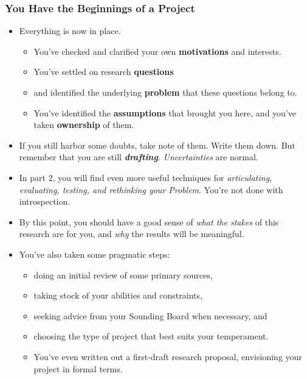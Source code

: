 \documentclass[11pt]{article}
\begin{document}
\subsubsection{You Have the Beginnings of a Project}
\begin{itemize}
\item Everything is now in place.
\begin{itemize}
\item You’ve checked and clarified your own \textbf{motivations} and interests.
\item You’ve settled on research \textbf{questions} 
\item and identified the underlying \textbf{problem} that these questions belong to.
\item You’ve identified the \textbf{assumptions} that brought you here, and you’ve taken \textbf{ownership} of them.
\end{itemize}

\item If you still harbor some doubts, take note of them. Write them down. But remember that you are still \emph{\textbf{drafting}}. \emph{Uncertainties} are normal.

\item In part 2, you will find even more useful techniques for \emph{articulating, evaluating, testing, and rethinking your Problem}. You’re not done with introspection.

\item By this point, you should have a good sense of \emph{what the stakes} of this research are for you, and \emph{why} the results will be meaningful. 

\item You’ve also taken some pragmatic steps:
\begin{itemize}
\item doing an initial review of some primary sources, 
\item taking stock of your abilities and constraints, 
\item seeking advice from your Sounding Board when necessary, and 
\item choosing the type of project that best suits your temperament. 
\item You’ve even written out a first-draft research proposal, envisioning your project in formal terms. 
\end{itemize}
\end{itemize}
\end{document}
